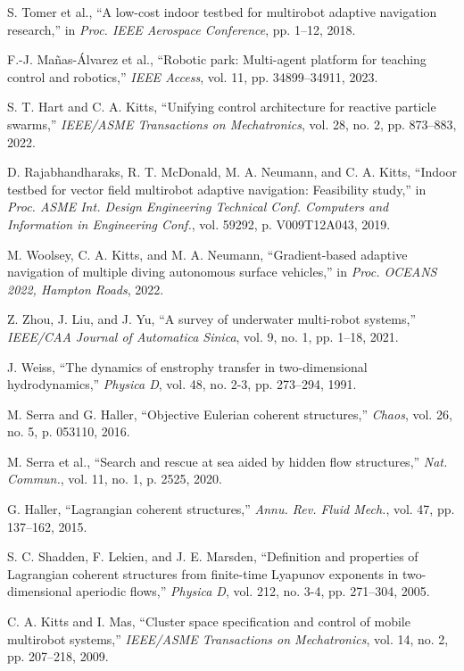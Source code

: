  S. Tomer et al., ``A low-cost indoor testbed for multirobot adaptive navigation research,'' in \textit{Proc. IEEE Aerospace Conference}, pp. 1--12, 2018.

 F.-J. Mañas-Álvarez et al., ``Robotic park: Multi-agent platform for teaching control and robotics,'' \textit{IEEE Access}, vol. 11, pp. 34899--34911, 2023.

 S. T. Hart and C. A. Kitts, ``Unifying control architecture for reactive particle swarms,'' \textit{IEEE/ASME Transactions on Mechatronics}, vol. 28, no. 2, pp. 873--883, 2022.

 D. Rajabhandharaks, R. T. McDonald, M. A. Neumann, and C. A. Kitts, ``Indoor testbed for vector field multirobot adaptive navigation: Feasibility study,'' in \textit{Proc. ASME Int. Design Engineering Technical Conf. Computers and Information in Engineering Conf.}, vol. 59292, p. V009T12A043, 2019.

 M. Woolsey, C. A. Kitts, and M. A. Neumann, ``Gradient-based adaptive navigation of multiple diving autonomous surface vehicles,'' in \textit{Proc. OCEANS 2022, Hampton Roads}, 2022.

 Z. Zhou, J. Liu, and J. Yu, ``A survey of underwater multi-robot systems,'' \textit{IEEE/CAA Journal of Automatica Sinica}, vol. 9, no. 1, pp. 1--18, 2021.

 J. Weiss, ``The dynamics of enstrophy transfer in two-dimensional hydrodynamics,'' \textit{Physica D}, vol. 48, no. 2-3, pp. 273--294, 1991.

 M. Serra and G. Haller, ``Objective Eulerian coherent structures,'' \textit{Chaos}, vol. 26, no. 5, p. 053110, 2016.

 M. Serra et al., ``Search and rescue at sea aided by hidden flow structures,'' \textit{Nat. Commun.}, vol. 11, no. 1, p. 2525, 2020.

 G. Haller, ``Lagrangian coherent structures,'' \textit{Annu. Rev. Fluid Mech.}, vol. 47, pp. 137--162, 2015.

 S. C. Shadden, F. Lekien, and J. E. Marsden, ``Definition and properties of Lagrangian coherent structures from finite-time Lyapunov exponents in two-dimensional aperiodic flows,'' \textit{Physica D}, vol. 212, no. 3-4, pp. 271--304, 2005.

 C. A. Kitts and I. Mas, ``Cluster space specification and control of mobile multirobot systems,'' \textit{IEEE/ASME Transactions on Mechatronics}, vol. 14, no. 2, pp. 207--218, 2009.

